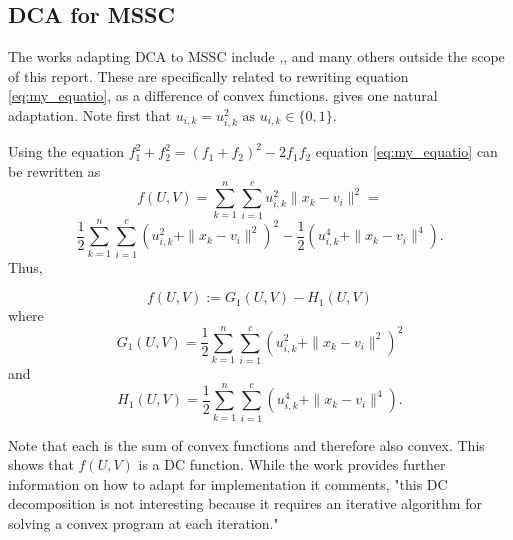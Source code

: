\subsection{DCA for MSSC}
The works adapting DCA to MSSC include \cite{Ordin_heuristic_2015},\cite{artacho_boosted_nodate}, and many others outside the scope of this report. These are specifically related to rewriting equation \ref{eq:my_equatio}, as a difference of convex functions. \cite{an_minimum_2009} gives one natural adaptation. Note first that $u_{i,k} = u_{i,k}^2 \text{ as } u_{i,k} \in \{0,1\}$. 

Using the equation $f_1^2+ f_2^2 = (f_1+f_2)^2-2f_1f_2$ equation \ref{eq:my_equatio} can be rewritten as 
\[ f(U,V) = \sum_{k=1}^{n}\sum_{i=1}^{c}u_{i,k}^2 \|x_k - v_i\|^2 =\]
\[\frac{1}{2}\sum_{k=1}^{n}\sum_{i=1}^{c}(u_{i,k}^2 +\|x_k - v_i\|^2)^2-\frac{1}{2}(u_{i,k}^4+\|x_k - v_i\|^4).\]
Thus, \

\begin{equation}
    f(U,V):=G_1(U,V)-H_1(U,V)
\end{equation} 
where
\begin{equation}
G_1(U,V) = \frac{1}{2}\sum_{k=1}^{n}\sum_{i=1}^{c}(u_{i,k}^2 +\|x_k - v_i\|^2)^2
\end{equation} 
and
\begin{equation}
H_1(U,V)=\frac{1}{2}\sum_{k=1}^{n}\sum_{i=1}^{c}(u_{i,k}^4+\|x_k - v_i\|^4).
\end{equation} 

Note that each is the sum of convex functions and therefore also convex. This shows that $f(U,V)$ is a DC function. While the work \cite{an_minimum_2009} provides further information on how to adapt for implementation it comments, "this DC decomposition is not interesting because it requires an iterative algorithm for solving a convex program at each iteration."